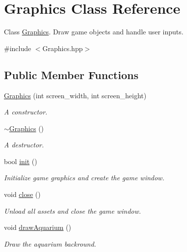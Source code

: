 \hypertarget{class_graphics}{}\section{Graphics Class Reference}
\label{class_graphics}


Class \mbox{\hyperlink{class_graphics}{Graphics}}. Draw game objects and handle user inputs.  




{\ttfamily \#include $<$Graphics.\+hpp$>$}

\subsection*{Public Member Functions}
\begin{DoxyCompactItemize}
\item 
\mbox{\hyperlink{class_graphics_ad02d1ced072b77d6177cb2ec6ea5b7df}{Graphics}} (int screen\+\_\+width, int screen\+\_\+height)
\begin{DoxyCompactList}\small\item\em A constructor. \end{DoxyCompactList}\item 
\mbox{\hyperlink{class_graphics_a7841c9a961ac9bca33bd30ddf8066cdb}{$\sim$\+Graphics}} ()
\begin{DoxyCompactList}\small\item\em A destructor. \end{DoxyCompactList}\item 
bool \mbox{\hyperlink{class_graphics_a64b5764b2dbef1b6df23ce18b1a918a1}{init}} ()
\begin{DoxyCompactList}\small\item\em Initialize game graphics and create the game window. \end{DoxyCompactList}\item 
void \mbox{\hyperlink{class_graphics_a5285ec6ed237f24f7d7cf2423886a0cc}{close}} ()
\begin{DoxyCompactList}\small\item\em Unload all assets and close the game window. \end{DoxyCompactList}\item 
void \mbox{\hyperlink{class_graphics_a5f3a657a7c54f13108bd90e6a85bd02e}{draw\+Aquarium}} ()
\begin{DoxyCompactList}\small\item\em Draw the aquarium backround. \end{DoxyCompactList}\item 

\end{DoxyCompactItemize}
